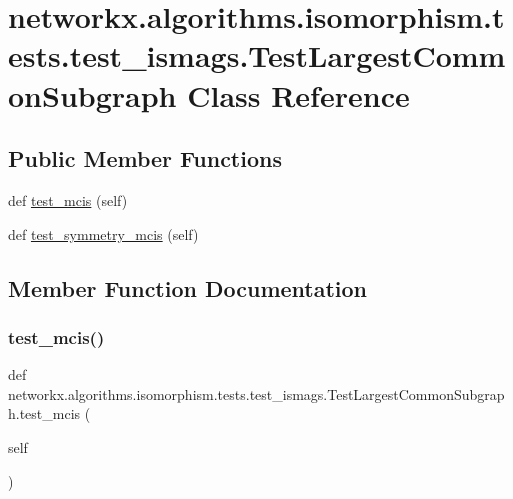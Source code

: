 \hypertarget{classnetworkx_1_1algorithms_1_1isomorphism_1_1tests_1_1test__ismags_1_1TestLargestCommonSubgraph}{}\section{networkx.\+algorithms.\+isomorphism.\+tests.\+test\+\_\+ismags.\+Test\+Largest\+Common\+Subgraph Class Reference}
\label{classnetworkx_1_1algorithms_1_1isomorphism_1_1tests_1_1test__ismags_1_1TestLargestCommonSubgraph}
\subsection*{Public Member Functions}
\begin{DoxyCompactItemize}
\item 
def \hyperlink{classnetworkx_1_1algorithms_1_1isomorphism_1_1tests_1_1test__ismags_1_1TestLargestCommonSubgraph_a254197e788bf92b656f8bd525bc00811}{test\+\_\+mcis} (self)
\item 
def \hyperlink{classnetworkx_1_1algorithms_1_1isomorphism_1_1tests_1_1test__ismags_1_1TestLargestCommonSubgraph_a07436576b11c1d59a4b49926526676d6}{test\+\_\+symmetry\+\_\+mcis} (self)
\end{DoxyCompactItemize}


\subsection{Member Function Documentation}
\mbox{\label{classnetworkx_1_1algorithms_1_1isomorphism_1_1tests_1_1test__ismags_1_1TestLargestCommonSubgraph_a254197e788bf92b656f8bd525bc00811}} 
\subsubsection{\texorpdfstring{test\+\_\+mcis()}{test\_mcis()}}
{\footnotesize\ttfamily def networkx.\+algorithms.\+isomorphism.\+tests.\+test\+\_\+ismags.\+Test\+Largest\+Common\+Subgraph.\+test\+\_\+mcis (\begin{DoxyParamCaption}\item[{}]{self }\end{DoxyParamCaption})}


